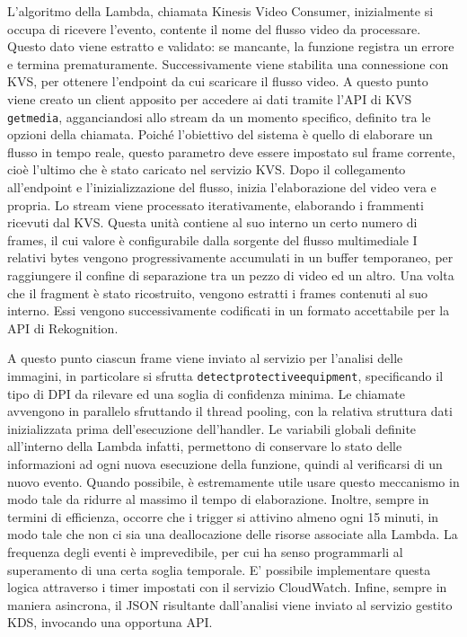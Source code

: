 L'algoritmo della Lambda, chiamata Kinesis Video Consumer, inizialmente si occupa di ricevere l'evento, contente il nome del flusso video da processare. Questo dato viene estratto e validato: se mancante, la funzione registra un errore e termina prematuramente. Successivamente viene stabilita una connessione con KVS, per ottenere l'endpoint da cui scaricare il flusso video. A questo punto viene creato un client apposito per accedere ai dati tramite l'API di KVS \texttt{get\textunderscore media}, agganciandosi allo stream da un momento specifico, definito tra le opzioni della chiamata. Poiché l'obiettivo del sistema è quello di elaborare un flusso in tempo reale, questo parametro deve essere impostato sul frame corrente, cioè l'ultimo che è stato caricato nel servizio KVS. Dopo il collegamento all'endpoint e l'inizializzazione del flusso, inizia l'elaborazione del video vera e propria. Lo stream viene processato iterativamente, elaborando i frammenti ricevuti dal KVS. %
Questa unità contiene al suo interno un certo numero di frames, il cui valore è configurabile dalla sorgente del flusso multimediale %
I relativi bytes vengono progressivamente accumulati in un buffer temporaneo, per raggiungere il confine di separazione tra un pezzo di video ed un altro. Una volta che il fragment è stato ricostruito, vengono estratti i frames contenuti al suo interno. Essi vengono successivamente codificati in un formato accettabile per la API di Rekognition. 


A questo punto ciascun frame viene inviato al servizio per l'analisi delle immagini, in particolare si sfrutta \sloppy\texttt{detect\textunderscore protective\textunderscore equipment}\fussy, specificando il tipo di DPI da rilevare ed una soglia di confidenza minima. Le chiamate avvengono in parallelo sfruttando il thread pooling, con la relativa struttura dati inizializzata prima dell'esecuzione dell'handler. Le variabili globali definite all'interno della Lambda infatti, permettono di conservare lo stato delle informazioni ad ogni nuova esecuzione della funzione, quindi al verificarsi di un nuovo evento. Quando possibile, è estremamente utile usare questo meccanismo in modo tale da ridurre al massimo il tempo di elaborazione. Inoltre, sempre in termini di efficienza, occorre che i trigger si attivino almeno ogni 15 minuti, in modo tale che non ci sia una deallocazione delle risorse associate alla Lambda. La frequenza degli eventi è imprevedibile, per cui ha senso programmarli al superamento di una certa soglia temporale. E' possibile implementare questa logica attraverso i timer impostati con il servizio CloudWatch. Infine, sempre in maniera asincrona, il JSON risultante dall'analisi viene inviato al servizio gestito KDS, invocando una opportuna API.




